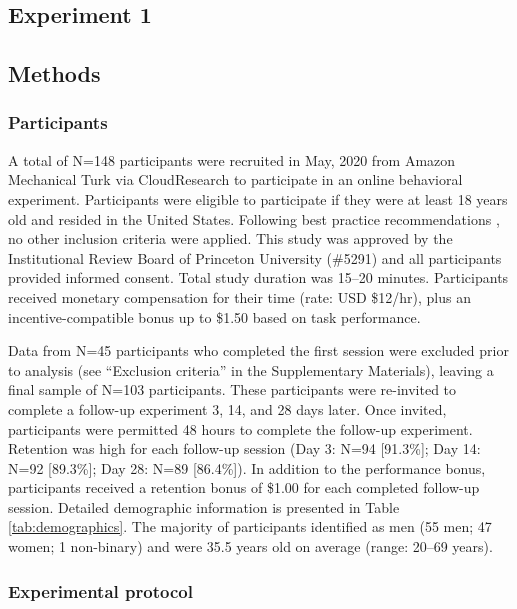 \documentclass[a4paper,12pt]{article}
\begin{document}
\begin{refsection}[main]
\section*{Experiment 1}

\subsection*{Methods}

\subsubsection*{Participants}

A total of N=148 participants were recruited in May, 2020 from Amazon Mechanical Turk via CloudResearch \cite{litman2017turkprime} to participate in an online behavioral experiment. Participants were eligible to participate if they were at least 18 years old and resided in the United States. Following best practice recommendations \cite{robinson2019tapped}, no other inclusion criteria were applied. This study was approved by the Institutional Review Board of Princeton University (\#5291) and all participants provided informed consent. Total study duration was 15--20 minutes. Participants received monetary compensation for their time (rate: USD \$12/hr), plus an incentive-compatible bonus up to \$1.50 based on task performance. 

Data from N=45 participants who completed the first session were excluded prior to analysis (see ``Exclusion criteria'' in the Supplementary Materials), leaving a final sample of N=103 participants. These participants were re-invited to complete a follow-up experiment 3, 14, and 28 days later. Once invited, participants were permitted 48 hours to complete the follow-up experiment. Retention was high for each follow-up session (Day 3: N=94 [91.3\%]; Day 14: N=92 [89.3\%]; Day 28: N=89 [86.4\%]). In addition to the performance bonus, participants received a retention bonus of \$1.00 for each completed follow-up session. Detailed demographic information is presented in Table \ref{tab:demographics}. The majority of participants identified as men (55 men; 47 women; 1 non-binary) and were 35.5 years old on average (range: 20--69 years).

\subsubsection*{Experimental protocol}


\end{refsection}
\end{document}
